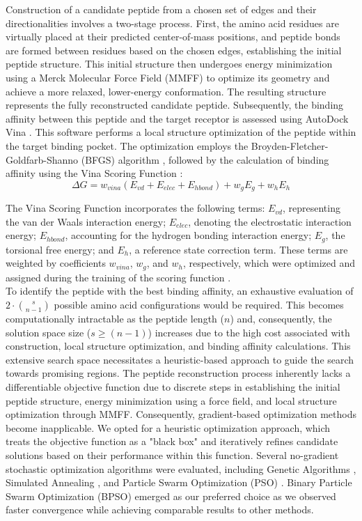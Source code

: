 Construction of a candidate peptide from a chosen set of edges and their directionalities involves a two-stage process. First, the amino acid residues are virtually placed at their predicted center-of-mass positions, and peptide bonds are formed between residues based on the chosen edges, establishing the initial peptide structure. This initial structure then undergoes energy minimization using a Merck Molecular Force Field (MMFF) \cite{halgren1996merck} to optimize its geometry and achieve a more relaxed, lower-energy conformation. The resulting structure represents the fully reconstructed candidate peptide. Subsequently, the binding affinity between this peptide and the target receptor is assessed using AutoDock Vina \cite{trott2010autodock}. This software performs a local structure optimization of the peptide within the target binding pocket. The optimization employs the Broyden-Fletcher-Goldfarb-Shanno (BFGS) algorithm \cite{head1985broyden}, followed by the calculation of binding affinity using the Vina Scoring Function \cite{trott2010autodock}:
$$\Delta G = w_{vina}(E_{vd}+ E_{elec} + E_{hbond}) + w_gE_g + w_hE_h$$

The Vina Scoring Function incorporates the following terms: $E_{vd}$, representing the van der Waals interaction energy; $E_{elec}$, denoting the electrostatic interaction energy; $E_{hbond}$, accounting for the hydrogen bonding interaction energy; $E_g$, the torsional free energy; and $E_h$, a reference state correction term. These terms are weighted by coefficients $w_{vina}$, $w_g$, and $w_h$, respectively, which were optimized and assigned during the training of the scoring function \cite{trott2010autodock}. \\

To identify the peptide with the best binding affinity, an exhaustive evaluation of $2 \cdot {s \choose n-1}$ possible amino acid configurations would be required. This becomes computationally intractable as the peptide length ($n$) and, consequently, the solution space size ($s \geq (n-1)$) increases due to the high cost associated with construction, local structure optimization, and binding affinity calculations. This extensive search space necessitates a heuristic-based approach to guide the search towards promising regions. The peptide reconstruction process inherently lacks a differentiable objective function due to discrete steps in establishing the initial peptide structure, energy minimization using a force field, and local structure optimization through MMFF. Consequently, gradient-based optimization methods become inapplicable. We opted for a heuristic optimization approach, which treats the objective function as a "black box" and iteratively refines candidate solutions based on their performance within this function. Several no-gradient stochastic optimization algorithms were evaluated, including Genetic Algorithms \cite{holland1992adaptation}, Simulated Annealing \cite{kirkpatrick1983optimization}, and Particle Swarm Optimization (PSO) \cite{eberhart1995new, kennedy1995particle}. Binary Particle Swarm Optimization (BPSO) emerged as our preferred choice as we observed faster convergence while achieving comparable results to other methods. \\

